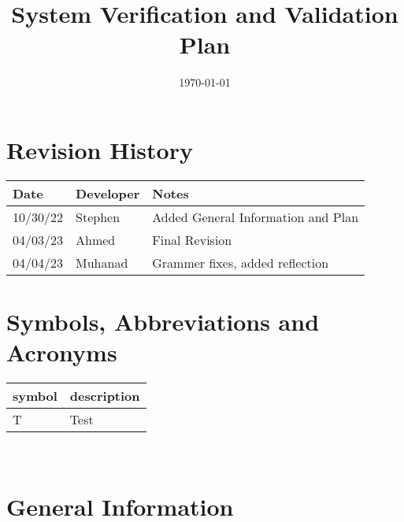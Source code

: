 \documentclass[12pt, titlepage]{article}
\begin{document}
\title{System Verification and Validation Plan \\\progname{}} 
\author{\authname}
\date{\today}
	
\maketitle


\section{Revision History}

\begin{tabularx}{\textwidth}{p{3cm}p{2cm}X}
\toprule {\bf Date} & {\bf Developer} & {\bf Notes}\\
\midrule
10/30/22 & Stephen & Added General Information and Plan\\
04/03/23 & Ahmed & Final Revision\\
04/04/23 & Muhanad & Grammer fixes, added reflection \\

\bottomrule
\end{tabularx}

\newpage

\tableofcontents
\listoftables
\listoffigures



\newpage

\section{Symbols, Abbreviations and Acronyms}

\renewcommand{\arraystretch}{1.2}
\begin{tabular}{l l} 
  \toprule		
  \textbf{symbol} & \textbf{description}\\
  \midrule 
  T & Test\\
  \bottomrule
\end{tabular}\\


\newpage



\section{General Information}
\end{document}
